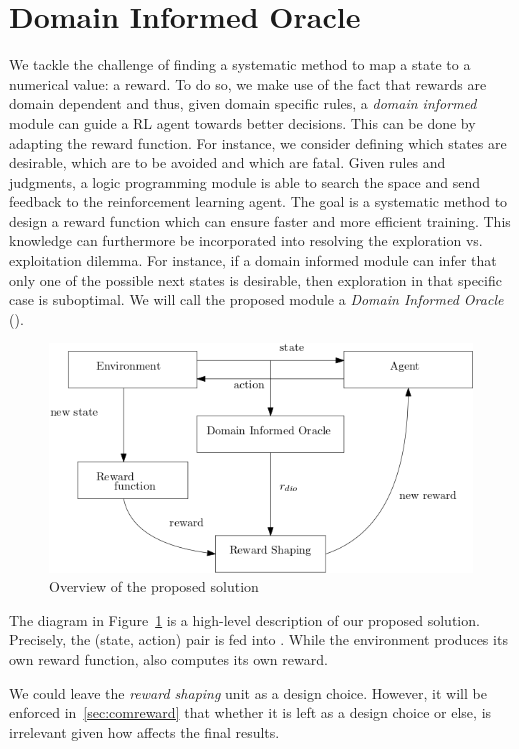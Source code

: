 \section{Domain Informed Oracle} 

We tackle the challenge of finding a systematic method to map a state to a numerical value: a reward. 
To do so, we make use of the fact that rewards are domain dependent and thus, given domain specific rules, a \emph{domain informed} module can guide a RL agent towards better decisions. This can be done by 
adapting the reward function. For instance, we consider defining which states are desirable, which are to be avoided and which are fatal. Given rules and judgments, a logic programming module 
is able to search the space and send feedback to the reinforcement learning agent. The goal is a systematic method to design a reward function which can ensure faster and more efficient 
training. This knowledge can furthermore be incorporated into resolving the exploration vs. exploitation dilemma. For instance, if a domain informed module 
can infer that only one of the possible next states is desirable, then exploration in that specific case is suboptimal.  
We will call the proposed module a \emph{Domain Informed Oracle}
(\dio{}).

\begin{figure}[H]
  \centering
  \includegraphics[scale=0.45]{figures/overview.png}
  \caption{Overview of the proposed solution}
  \label{fig:overview}
\end{figure}


The diagram in Figure~\ref{fig:overview} is a high-level description of our proposed solution. 
%
Precisely, the (state, action) pair is fed into \dio{}. While the environment produces its own 
reward function, \dio{} also computes its own reward. 

We could leave the \emph{reward shaping} unit as a design choice. However, it will be enforced in~\ref{sec:comreward}
that whether it is left as a design choice or else, is irrelevant given how \dio{} affects the final results.

